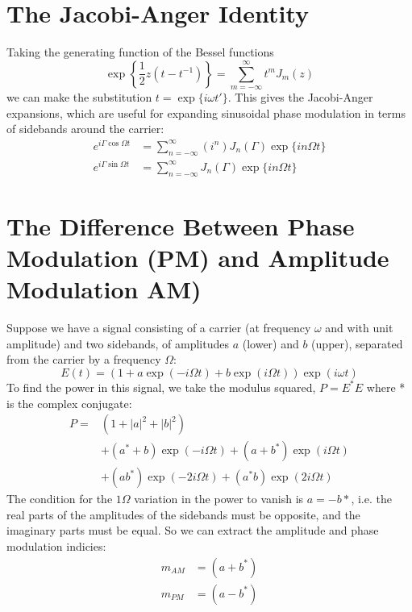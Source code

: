 \label{chapter7}
\section{The Jacobi-Anger Identity}
\label{sec:jacobi-anger}
Taking the generating function of the Bessel functions
\begin{equation}
\exp\left\{\frac{1}{2} z \left(t - t^{-1}\right)\right\} = \sum_{m=-\infty}^\infty t^m J_m(z)
\end{equation}
we can make the substitution $t = \exp \{i \omega t'\}$.
This gives the Jacobi-Anger expansions, which are useful for expanding sinusoidal phase modulation in terms of sidebands around the carrier:
\begin{align}
e^{i\Gamma\cos\Omega t} & = \sum_{n=-\infty}^{\infty} \left(i^n\right)  J_n(\Gamma) \exp\{i n \Omega t\} \\
e^{i\Gamma\sin\Omega t} & = \sum_{n=-\infty}^{\infty} J_n(\Gamma) \exp\{i n \Omega t\}
\end{align}

\section{The Difference Between Phase Modulation (PM) and Amplitude Modulation AM)}
\label{sec:am-vs-pm}
%
Suppose we have a signal consisting of a carrier (at frequency $\omega$ and
with unit amplitude) and two sidebands, of amplitudes $a$ (lower) and $b$
(upper), separated from the carrier by a frequency $\Omega$:
%
\begin{equation}
E(t) = \left(1 + a \exp(-i \Omega t) + b \exp(i \Omega t)\right)
\exp(i \omega t)
\end{equation}
%
To find the power in this signal, we take the
modulus squared, $P = E^*E$ where * is the complex conjugate:
%
\begin{equation}
\begin{split}
P = & \left(1 + |a|^2 + |b|^2\right) \\
    & + \left(a^* + b\right) \exp(-i \Omega t) + \left(a + b^*\right) \exp(i \Omega t) \\
    & + \left(ab^*\right) \exp(-2 i \Omega t) + \left(a^*b\right) \exp(2 i \Omega t)
\end{split}
\end{equation}
%
The condition for the $1\Omega$ variation in the power to vanish is
$a=-b*$, i.e. the real parts of the amplitudes of the sidebands must
be opposite, and the imaginary parts must be equal. So we can extract
the amplitude and phase modulation indicies:
%
\begin{equation}
\begin{split}
m_{AM} &= (a + b^*)\\
m_{PM} &= (a - b^*)
\end{split}
\end{equation}

